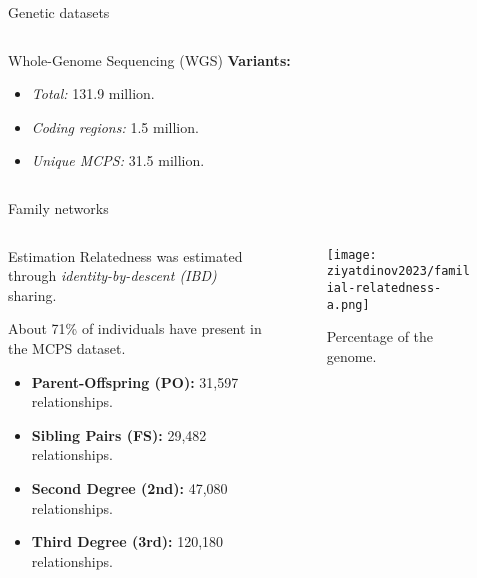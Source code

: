 \begin{frame}{Genetic datasets}
{\begin{columns}[t]
\begin{column}{0.3\textwidth}
\begin{block}{Whole-Genome Sequencing (WGS)}
                \textbf{Variants:}
                \begin{itemize}
                    \item \textit{Total:} 131.9 million.
                    \item \textit{Coding regions:} 1.5 million.
                    \item \textit{Unique MCPS:} 31.5 million.
                \end{itemize}
            \end{block}
        \end{column}
    \end{columns}
    }

    \vfill


\end{frame}

\begin{frame}{Family networks}

\begin{columns}[t]
    \begin{column}{0.45\textwidth} 

       \begin{exampleblock}{Estimation}
            Relatedness was estimated through \textit{identity-by-descent (IBD)} sharing.
       \end{exampleblock}

       \medskip
    
        About \alert{71\%} of individuals have  present in the MCPS dataset. 

       \begin{itemize}
           \item \textbf{Parent-Offspring (PO):} 31,597 relationships.
           \item \textbf{Sibling Pairs (FS):} 29,482 relationships.
           \item \textbf{Second Degree (2nd):} 47,080 relationships.
           \item \textbf{Third Degree (3rd):} 120,180 relationships.
       \end{itemize}


    \end{column}
    \begin{column}{0.45\textwidth}
        \begin{figure}[htpb]
        \centering
        \texttt{[image: ziyatdinov2023/familial-relatedness-a.png]}
        \caption{Percentage of the genome.}
        \label{fig:ibd-genome-percentage}
        \end{figure}
    \end{column}
\end{columns}
\end{frame}

